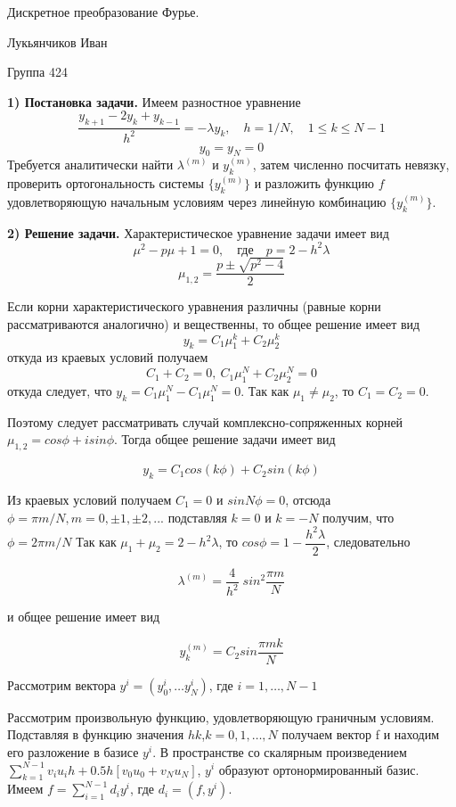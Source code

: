 \documentclass[12pt,a4paper]{scrartcl}
\begin{document}
\begin{titlepage}
\begin{center}
\large

Дискретное преобразование Фурье.

\end{center}
\vfill
\begin{flushright}
Лукьянчиков Иван

Группа 424
\end{flushright}
\end{titlepage}
\textbf{1) Постановка задачи.}
Имеем разностное уравнение
$$\dfrac{y_{k+1}-2y_{k}+y_{k-1}}{h^2}=-\lambda y_k, \quad h=1/N, \quad 1 \leqslant k \leqslant N-1$$
$$y_0=y_N=0$$
Требуется аналитически найти $\lambda^{(m)}$ и $y_k^{(m)}$, затем численно посчитать невязку, проверить ортогональность системы $\{y_k^{(m)}\}$ и разложить функцию $f$ удовлетворяющую начальным условиям через линейную комбинацию $\{y_k^{(m)}\}$.

\textbf{2) Решение задачи.}
Характеристическое уравнение задачи имеет вид
$$\mu^2 - p\mu + 1 = 0, \quad \text{где} \quad  p=2 - h^2 \lambda$$
$$\mu_{1,2} = \dfrac{p \pm \sqrt{p^2 - 4}}{2}$$

Если корни характеристического уравнения различны (равные корни рассматриваются аналогично) и вещественны, то общее решение имеет вид $$y_k = C_1 \mu_1^k + C_2 \mu_2^k$$ откуда из краевых условий получаем $$C_1 + C_2 = 0, \  C_1 \mu_1^N + C_2 \mu_2^N = 0 $$ откуда следует, что $y_k = C_1 \mu_1^N - C_1 \mu_1^N = 0$. Так как $\mu_1 \neq \mu_2$, то $C_1 = C_2 = 0$.

Поэтому следует рассматривать случай комплексно-сопряженных корней $\mu_{1,2} = cos\phi + isin\phi$. Тогда общее решение задачи имеет вид

$$y_k = C_1 cos(k \phi) + C_2 sin(k \phi)$$

Из краевых условий получаем $C_1 = 0$ и $sinN\phi = 0$, отсюда $\phi = \pi m / N, m=0,\pm1,\pm2,...$ подставляя $k = 0$ и $k = -N$ получим, что $\phi = 2 \pi m / N$ Так как $\mu_1 + \mu_2 = 2 - h^2 \lambda$, то $cos \phi = 1 - \dfrac{h^2 \lambda}{2}$, следовательно

$$\lambda^{(m)} = \dfrac{4}{h^2} \; sin^2 \dfrac{\pi m}{N}$$

и общее решение имеет вид

$$y_k^{(m)} = C_2 sin \dfrac{\pi m k}{N} $$

Рассмотрим вектора $y^i = (y_0^{i}, \dots y_N^{i})$, где $i = 1, \dots, N-1$

Рассмотрим произвольную функцию, удовлетворяющую граничным условиям. Подставляя в функцию значения $hk$,$k=0,1, \dots ,N$ получаем вектор f и находим его разложение в базисе ${y^i}$. В пространстве со скалярным произведением $\sum_{k=1}^{N-1} v_i u_i h + 0.5h[v_0 u_0+v_N u_N]$, $y^i$ образуют ортонормированный базис. Имеем $f = \sum_{i=1}^{N-1} d_i y^i $, где $d_i = (f,y^i)$.
\end{document}
